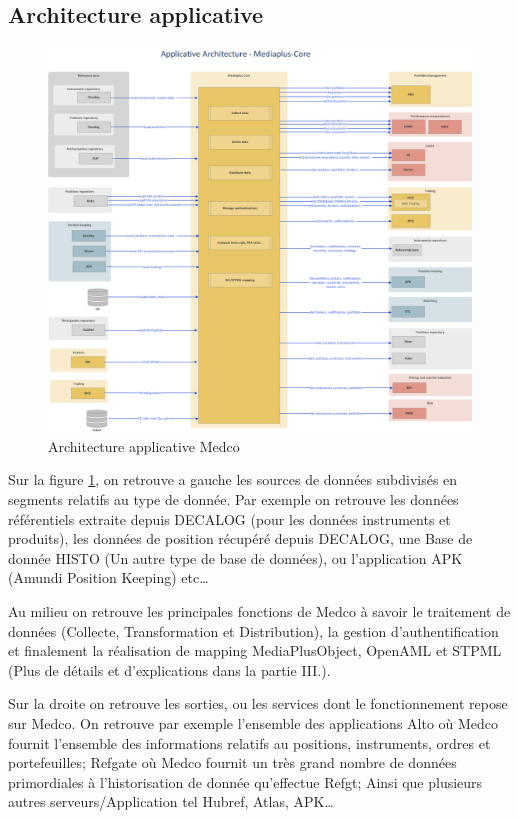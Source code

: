 \subsection{Architecture applicative}
\begin{figure}[ht]
    \centering
    \includegraphics[width=\columnwidth]{img/Architecture Medco.png}
    \caption{Architecture applicative Medco}
    \label{fig:medcoArch}
\end{figure}
\par Sur la figure \ref{fig:medcoArch}, on retrouve a gauche les sources de données subdivisés en segments relatifs au type de donnée. Par exemple on retrouve les données référentiels extraite depuis DECALOG (pour les données instruments et produits), les données de position récupéré depuis DECALOG, une Base de donnée HISTO (Un autre type de base de données), ou l'application APK (Amundi Position Keeping) etc\dots
\par Au milieu on retrouve les principales fonctions de Medco à savoir le traitement de données (Collecte, Transformation et Distribution), la gestion d'authentification et finalement la réalisation de mapping MediaPlusObject, OpenAML et STPML (Plus de détails et d'explications dans la partie III.).
\clearpage
\par Sur la droite on retrouve les sorties, ou les services dont le fonctionnement repose sur Medco. On retrouve par exemple l'ensemble des applications Alto où Medco fournit l'ensemble des informations relatifs au positions, instruments, ordres et portefeuilles; Refgate où Medco fournit un très grand nombre de données primordiales à l'historisation de donnée qu'effectue Refgt; Ainsi que plusieurs autres serveurs/Application tel Hubref, Atlas, APK\dots
